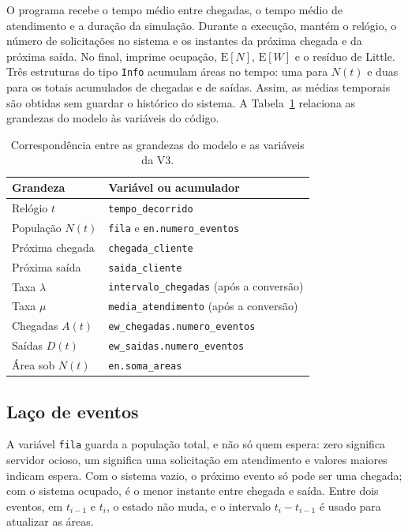 \documentclass[
  article,      %
  10pt,         %
  oneside,
  a4paper,
  twocolumn,    %
  english,
  brazil        %
]{abntex2}
\newcommand{\EN}{\mathrm{E}[N]}
\newcommand{\EW}{\mathrm{E}[W]}
\begin{document}
O programa recebe o tempo médio entre chegadas, o tempo médio de atendimento e a duração da simulação. Durante a execução, mantém o relógio, o número de solicitações no sistema e os instantes da próxima chegada e da próxima saída. No final, imprime ocupação, $\EN$, $\EW$ e o resíduo de Little. Três estruturas do tipo \texttt{Info} acumulam áreas no tempo: uma para $N(t)$ e duas para os totais acumulados de chegadas e de saídas. Assim, as médias temporais são obtidas sem guardar o histórico do sistema. A Tabela~\ref{tab:mapeamento} relaciona as grandezas do modelo às variáveis do código.

\begin{table}[htbp]
  \centering
  \caption{Correspondência entre as grandezas do modelo e as variáveis da V3.}
  \label{tab:mapeamento}
  \small
  \begin{tabularx}{\linewidth}{@{}lX@{}}
    \toprule
    Grandeza & Variável ou acumulador \\
    \midrule
    Relógio $t$ & \texttt{tempo\_decorrido} \\
    População $N(t)$ & \texttt{fila} e \texttt{en.numero\_eventos} \\
    Próxima chegada & \texttt{chegada\_cliente} \\
    Próxima saída & \texttt{saida\_cliente} \\
    Taxa $\lambda$ & \texttt{intervalo\_chegadas} (após a conversão) \\
    Taxa $\mu$ & \texttt{media\_atendimento} (após a conversão) \\
    Chegadas $A(t)$ & \texttt{ew\_chegadas.numero\_eventos} \\
    Saídas $D(t)$ & \texttt{ew\_saidas.numero\_eventos} \\
    Área sob $N(t)$ & \texttt{en.soma\_areas} \\
    \bottomrule
  \end{tabularx}
\end{table}

\subsection{Laço de eventos}

A variável \texttt{fila} guarda a população total, e não só quem espera: zero significa servidor ocioso, um significa uma solicitação em atendimento e valores maiores indicam espera. Com o sistema vazio, o próximo evento só pode ser uma chegada; com o sistema ocupado, é o menor instante entre chegada e saída. Entre dois eventos, em $t_{i-1}$ e $t_i$, o estado não muda, e o intervalo $t_i-t_{i-1}$ é usado para atualizar as áreas.
\end{document}
